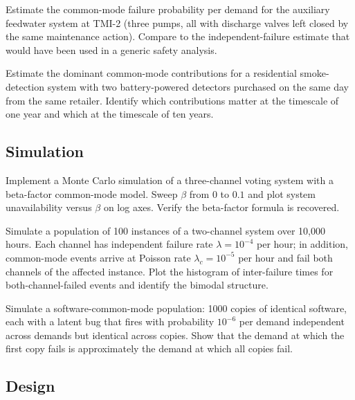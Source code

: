 \begin{exercise}
Estimate the common-mode failure probability per demand for the auxiliary feedwater system at TMI-2 (three pumps, all with discharge valves left closed by the same maintenance action). Compare to the independent-failure estimate that would have been used in a generic safety analysis.
\end{exercise}

\begin{exercise}
Estimate the dominant common-mode contributions for a residential smoke-detection system with two battery-powered detectors purchased on the same day from the same retailer. Identify which contributions matter at the timescale of one year and which at the timescale of ten years.
\end{exercise}

\subsection*{Simulation}

\begin{exercise}
Implement a Monte Carlo simulation of a three-channel voting system with a beta-factor common-mode model. Sweep $\beta$ from $0$ to $0.1$ and plot system unavailability versus $\beta$ on log axes. Verify the beta-factor formula is recovered.
\end{exercise}

\begin{exercise}
Simulate a population of 100 instances of a two-channel system over 10,000 hours. Each channel has independent failure rate $\lambda = 10^{-4}$ per hour; in addition, common-mode events arrive at Poisson rate $\lambda_c = 10^{-5}$ per hour and fail both channels of the affected instance. Plot the histogram of inter-failure times for both-channel-failed events and identify the bimodal structure.
\end{exercise}

\begin{exercise}
Simulate a software-common-mode population: 1000 copies of identical software, each with a latent bug that fires with probability $10^{-6}$ per demand independent across demands but identical across copies. Show that the demand at which the first copy fails is approximately the demand at which all copies fail.
\end{exercise}

\subsection*{Design}


